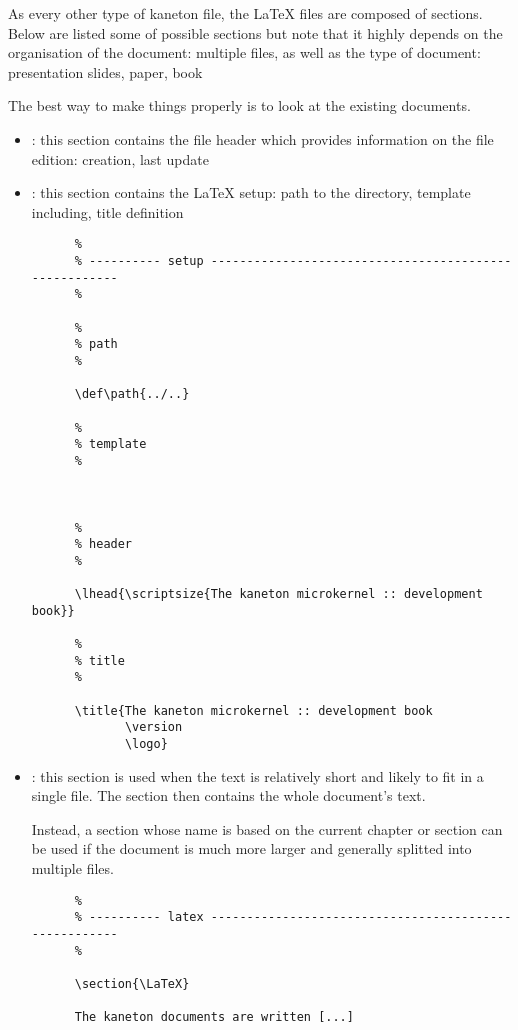 As every other type of kaneton file, the {\LaTeX} files are composed of
sections. Below are listed some of possible sections but note that it
highly depends on the organisation of the document: multiple files, \etc{}
as well as the type of document: presentation slides, paper, book \etc{}

The best way to make things properly is to look at the existing documents.

\begin{itemize}
  \item
    : this section contains the file header which provides
    information on the file edition: creation, last update \etc{}
  \item
    : this section contains the {\LaTeX} setup: path to the
     directory, template including, title definition \etc{}

    \begin{verbatim}
      %
      % ---------- setup ------------------------------------------------------
      %

      %
      % path
      %

      \def\path{../..}

      %
      % template
      %

      

      %
      % header
      %

      \lhead{\scriptsize{The kaneton microkernel :: development book}}

      %
      % title
      %

      \title{The kaneton microkernel :: development book
             \version
             \logo}
    \end{verbatim}
  \item
    : this section is used when the text is relatively short
    and likely to fit in a single file. The section then contains the
    whole document's text.

    Instead, a section whose name is based on the current chapter or section
    can be used if the document is much more larger and generally splitted
    into multiple files.

    \begin{verbatim}
      %
      % ---------- latex ------------------------------------------------------
      %

      \section{\LaTeX}

      The kaneton documents are written [...]
    \end{verbatim}
\end{itemize}

